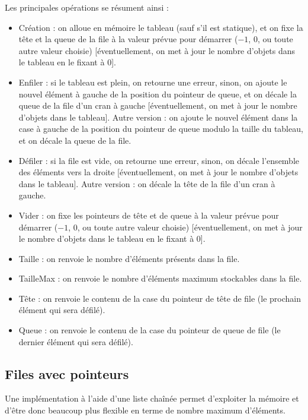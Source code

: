 \documentclass[11pt,a4paper]{article}
\begin{document}
Les principales opérations se résument ainsi :
\begin{itemize}
\item Création : on alloue en mémoire le tableau (sauf s'il est statique), et on fixe la tête et la queue de la file à la valeur prévue pour démarrer ($ -1 $, $ 0 $, ou toute autre valeur choisie) [éventuellement, on met à jour le nombre d'objets dans le tableau en le fixant à $ 0 $].
\item Enfiler : si le tableau est plein, on retourne une erreur, sinon, on ajoute le nouvel élément à gauche de la position du pointeur de queue, et on décale la queue de la file d'un cran à gauche [éventuellement, on met à jour le nombre d'objets dans le tableau].
Autre version : on ajoute le nouvel élément dans la case à gauche de la position du pointeur de queue modulo la taille du tableau, et on décale la queue de la file.
\item Défiler : si la file est vide, on retourne une erreur, sinon, on décale l'ensemble des éléments vers la droite [éventuellement, on met à jour le nombre d'objets dans le tableau].
Autre version : on décale la tête de la file d'un cran à gauche.
\item Vider : on fixe les pointeurs de tête et de queue à la valeur prévue pour démarrer ($ -1 $, $ 0 $, ou toute autre valeur choisie) [éventuellement, on met à jour le nombre d'objets dans le tableau en le fixant à $ 0 $].
\item Taille : on renvoie le nombre d'éléments présents dans la file.
\item TailleMax : on renvoie le nombre d'éléments maximum stockables dans la file.
\item Tête : on renvoie le contenu de la case du pointeur de tête de file (le prochain élément qui sera défilé).
\item Queue : on renvoie le contenu de la case du pointeur de queue de file (le dernier élément qui sera défilé).
\end{itemize}


\bigskip


\subsection{Files avec pointeurs}

\bigskip

Une implémentation à l'aide d'une liste chaînée permet d'exploiter la mémoire et d'être donc beaucoup plus flexible en terme de nombre maximum d'éléments.
\end{document}
